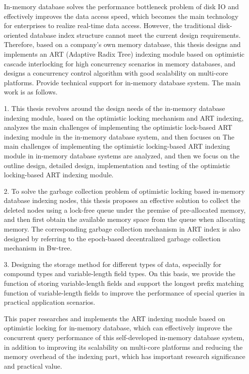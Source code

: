\begin{abstract*}
  In-memory database solves the performance bottleneck problem of disk IO and effectively improves the data access speed, which becomes the main technology for enterprises to realize real-time data access. However, the traditional disk-oriented database index structure cannot meet the current design requirements.
Therefore, based on a company's own memory database, this thesis designs and implements an ART (Adaptive Radix Tree) indexing module based on optimistic cascade interlocking for high concurrency scenarios in memory databases, and designs a concurrency control algorithm with good scalability on multi-core platforms. Provide technical support for in-memory database system. The main work is as follows.

1. This thesis revolves around the design needs of the in-memory database indexing module, based on the optimistic locking mechanism and ART indexing,
analyzes the main challenges of implementing the optimistic lock-based ART indexing module in the in-memory database system, and then focuses on
The main challenges of implementing the optimistic locking-based ART indexing module in in-memory database systems are analyzed, and then we focus on the outline design, detailed design, implementation and testing of the optimistic locking-based ART indexing module.

2. To solve the garbage collection problem of optimistic locking based in-memory database indexing nodes, this thesis proposes an effective solution to collect the deleted nodes using a lock-free queue under the premise of pre-allocated memory, and then first obtain the available memory space from the queue when allocating memory. The corresponding garbage collection mechanism in ART index is also designed by referring to the epoch-based decentralized garbage collection mechanism in Bw-tree.

3. Designing the storage method for different types of data, especially for compound types and variable-length field types.
On this basis, we provide the function of storing variable-length fields and support the longest prefix matching function of variable-length fields to improve the performance of special queries in practical application scenarios.

This paper researches and implements the ART indexing module based on optimistic locking for in-memory database, which can effectively improve the concurrent query performance of this self-developed in-memory database system, in addition to improving its scalability on multi-core platforms and reducing the memory overhead of the indexing part, which has important research significance and practical value.

\end{abstract*}
